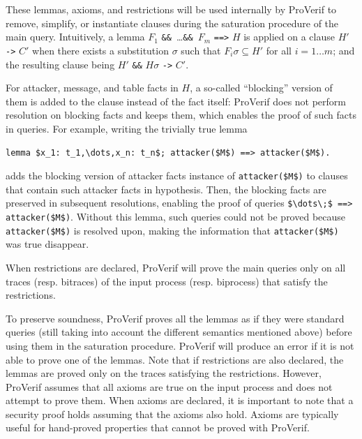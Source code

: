 \documentclass{book}
\begin{document}
These lemmas, axioms, and restrictions will be used internally by ProVerif to remove, simplify, or instantiate clauses during the saturation procedure of the main query. Intuitively, a lemma $F_1$ \lstinline!&&!\ \ldots \lstinline!&&!\ $F_m$ \lstinline!==>! $H$ is applied on a clause $H'$ \lstinline!->! $C'$ when there exists a substitution $\sigma$ such that $F_i\sigma \subseteq H'$ for all $i = 1\ldots m$; and the resulting clause being $H'$ \lstinline!&&!  $H\sigma$ \lstinline!->! $C'$.

For attacker, message, and table facts in $H$, a so-called ``blocking'' version of them is added to the clause instead of the fact itself: ProVerif does not perform resolution on blocking facts and keeps them, which enables the proof of such facts in queries. For example, writing the trivially true lemma
\begin{lstlisting}[numbers=none]
	lemma $x_1: t_1,\dots,x_n: t_n$; attacker($M$) ==> attacker($M$).
\end{lstlisting}
adds the blocking version of attacker facts instance of \lstinline!attacker($M$)! to clauses that contain such attacker facts in hypothesis. Then, the blocking facts are preserved in subsequent resolutions, enabling the proof of queries \lstinline!$\dots\;$ ==> attacker($M$)!. Without this lemma, such queries could not be proved because \lstinline!attacker($M$)! is resolved upon, making the information that \lstinline!attacker($M$)! was true disappear.

When restrictions are declared, ProVerif will prove the main queries only on all traces (resp. bitraces) of the input process (resp. biprocess) that satisfy the restrictions.

To preserve soundness, ProVerif proves all the lemmas as if they were standard queries (still taking into account the different semantics mentioned above) before using them in the saturation procedure. ProVerif will produce an error if it is not able to prove one of the lemmas. Note that if restrictions are also declared, the lemmas are proved only on the traces satisfying the restrictions.
However, ProVerif assumes that all axioms are true on the input process and does not attempt to prove them. When axioms are declared, it is important to note that a security proof holds assuming that the axioms also hold. Axioms are typically useful for hand-proved properties that cannot be proved with ProVerif.
\end{document}
